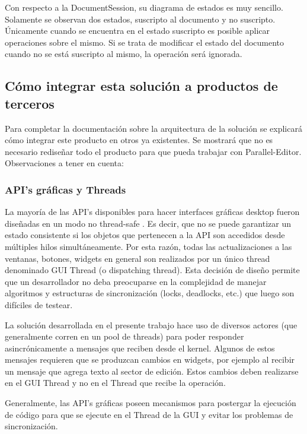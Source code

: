 \documentclass[12pt,a4paper]{article}
\begin{document}
Con respecto a la DocumentSession, su diagrama de estados es muy sencillo. Solamente se observan dos estados, suscripto al
documento y no suscripto. Únicamente cuando se encuentra en el estado suscripto es posible aplicar operaciones sobre el mismo.
Si se trata de modificar el estado del documento cuando no se está suscripto al mismo, la operación será ignorada.

\subsection{Cómo integrar esta solución a productos de terceros}
Para completar la documentación sobre la arquitectura de la solución se explicará cómo integrar este producto en otros ya
existentes. Se mostrará que no es necesario rediseñar todo el producto para que pueda trabajar con Parallel-Editor. \\

Observaciones a tener en cuenta:

\subsubsection{API’s gráficas y Threads}

La mayoría de las API’s disponibles para hacer interfaces gráficas desktop fueron diseñadas en un 
modo no thread-safe \cite{threads-swing,threads-swt}. Es decir, que no se puede garantizar un estado 
consistente si los objetos que pertenecen a la API son accedidos desde múltiples hilos simultáneamente. 
Por esta razón, todas las actualizaciones a las ventanas, botones, widgets
en general son realizados por un único thread denominado GUI Thread (o dispatching thread). Esta decisión de diseño permite que
un desarrollador no deba preocuparse en la complejidad de manejar algoritmos y estructuras de sincronización
(locks, deadlocks, etc.) que luego son difíciles de testear.

La solución desarrollada en el presente trabajo hace uso de diversos actores (que generalmente corren en un pool de threads) para poder 
responder asincrónicamente a mensajes que reciben desde el kernel. Algunos de estos mensajes requieren que se produzcan
cambios en widgets, por ejemplo al recibir un mensaje que agrega texto al sector de edición. Estos cambios deben realizarse en
el GUI Thread y no en el Thread que recibe la operación.

Generalmente, las API’s gráficas poseen mecanismos para postergar la ejecución de código para que se ejecute en el Thread de
la GUI \cite{swing-invoke-later,swt-async} y evitar los problemas de sincronización.
\end{document}
